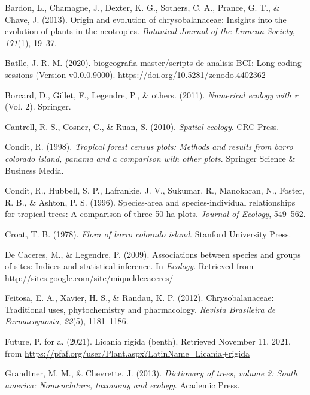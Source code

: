 \documentclass[11pt,]{article}
\begin{document}
\hypertarget{refs}{}
\hypertarget{ref-bardon2013origin}{}
Bardon, L., Chamagne, J., Dexter, K. G., Sothers, C. A., Prance, G. T.,
\& Chave, J. (2013). Origin and evolution of chrysobalanaceae: Insights
into the evolution of plants in the neotropics. \emph{Botanical Journal
of the Linnean Society}, \emph{171}(1), 19--37.

\hypertarget{ref-jose_ramon_martinez_batlle_2020_4402362}{}
Batlle, J. R. M. (2020). biogeografia-master/scripts-de-analisis-BCI:
Long coding sessions (Version v0.0.0.9000).
\url{https://doi.org/10.5281/zenodo.4402362}

\hypertarget{ref-borcard2011numerical}{}
Borcard, D., Gillet, F., Legendre, P., \& others. (2011).
\emph{Numerical ecology with r} (Vol. 2). Springer.

\hypertarget{ref-cantrell2010spatial}{}
Cantrell, R. S., Cosner, C., \& Ruan, S. (2010). \emph{Spatial ecology}.
CRC Press.

\hypertarget{ref-condit1998tropical}{}
Condit, R. (1998). \emph{Tropical forest census plots: Methods and
results from barro colorado island, panama and a comparison with other
plots}. Springer Science \& Business Media.

\hypertarget{ref-condit1996species}{}
Condit, R., Hubbell, S. P., Lafrankie, J. V., Sukumar, R., Manokaran,
N., Foster, R. B., \& Ashton, P. S. (1996). Species-area and
species-individual relationships for tropical trees: A comparison of
three 50-ha plots. \emph{Journal of Ecology}, 549--562.

\hypertarget{ref-croat1978flora}{}
Croat, T. B. (1978). \emph{Flora of barro colorado island}. Stanford
University Press.

\hypertarget{ref-indicspeciesR}{}
De Caceres, M., \& Legendre, P. (2009). Associations between species and
groups of sites: Indices and statistical inference. In \emph{Ecology}.
Retrieved from \url{http://sites.google.com/site/miqueldecaceres/}

\hypertarget{ref-feitosa2012chrysobalanaceae}{}
Feitosa, E. A., Xavier, H. S., \& Randau, K. P. (2012).
Chrysobalanaceae: Traditional uses, phytochemistry and pharmacology.
\emph{Revista Brasileira de Farmacognosia}, \emph{22}(5), 1181--1186.

\hypertarget{ref-PfafLrigida}{}
Future, P. for a. (2021). Licania rigida (benth). Retrieved November 11,
2021, from
\url{https://pfaf.org/user/Plant.aspx?LatinName=Licania+rigida}

\hypertarget{ref-grandtner2013dictionary}{}
Grandtner, M. M., \& Chevrette, J. (2013). \emph{Dictionary of trees,
volume 2: South america: Nomenclature, taxonomy and ecology}. Academic
Press.
\end{document}
